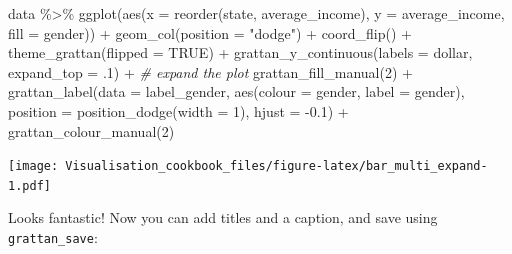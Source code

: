 \documentclass[
]{book}
\newenvironment{Shaded}{\begin{snugshade}}{\end{snugshade}}
\newcommand{\AttributeTok}[1]{\textcolor[rgb]{0.77,0.63,0.00}{#1}}
\newcommand{\CommentTok}[1]{\textcolor[rgb]{0.56,0.35,0.01}{\textit{#1}}}
\newcommand{\ConstantTok}[1]{\textcolor[rgb]{0.00,0.00,0.00}{#1}}
\newcommand{\DecValTok}[1]{\textcolor[rgb]{0.00,0.00,0.81}{#1}}
\newcommand{\FloatTok}[1]{\textcolor[rgb]{0.00,0.00,0.81}{#1}}
\newcommand{\FunctionTok}[1]{\textcolor[rgb]{0.00,0.00,0.00}{#1}}
\newcommand{\NormalTok}[1]{#1}
\newcommand{\SpecialCharTok}[1]{\textcolor[rgb]{0.00,0.00,0.00}{#1}}
\newcommand{\StringTok}[1]{\textcolor[rgb]{0.31,0.60,0.02}{#1}}
\begin{document}
\begin{Shaded}
\begin{Highlighting}[]
\NormalTok{data }\SpecialCharTok{\%\textgreater{}\%} 
  \FunctionTok{ggplot}\NormalTok{(}\FunctionTok{aes}\NormalTok{(}\AttributeTok{x =} \FunctionTok{reorder}\NormalTok{(state, average\_income),}
             \AttributeTok{y =}\NormalTok{ average\_income,}
             \AttributeTok{fill =}\NormalTok{ gender)) }\SpecialCharTok{+} 
  \FunctionTok{geom\_col}\NormalTok{(}\AttributeTok{position =} \StringTok{"dodge"}\NormalTok{) }\SpecialCharTok{+} 
  \FunctionTok{coord\_flip}\NormalTok{() }\SpecialCharTok{+} 
  \FunctionTok{theme\_grattan}\NormalTok{(}\AttributeTok{flipped =} \ConstantTok{TRUE}\NormalTok{) }\SpecialCharTok{+} 
  \FunctionTok{grattan\_y\_continuous}\NormalTok{(}\AttributeTok{labels =}\NormalTok{ dollar, }
                       \AttributeTok{expand\_top =}\NormalTok{ .}\DecValTok{1}\NormalTok{) }\SpecialCharTok{+} \CommentTok{\# expand the plot}
  \FunctionTok{grattan\_fill\_manual}\NormalTok{(}\DecValTok{2}\NormalTok{) }\SpecialCharTok{+} 
  \FunctionTok{grattan\_label}\NormalTok{(}\AttributeTok{data =}\NormalTok{ label\_gender,}
                \FunctionTok{aes}\NormalTok{(}\AttributeTok{colour =}\NormalTok{ gender,}
                    \AttributeTok{label =}\NormalTok{ gender), }
                \AttributeTok{position =} \FunctionTok{position\_dodge}\NormalTok{(}\AttributeTok{width =} \DecValTok{1}\NormalTok{), }
                \AttributeTok{hjust =} \SpecialCharTok{{-}}\FloatTok{0.1}\NormalTok{) }\SpecialCharTok{+} 
  \FunctionTok{grattan\_colour\_manual}\NormalTok{(}\DecValTok{2}\NormalTok{)}
\end{Highlighting}
\end{Shaded}

\texttt{[image: Visualisation\_cookbook\_files/figure-latex/bar\_multi\_expand-1.pdf]}

Looks fantastic! Now you can add titles and a caption, and save using \texttt{grattan\_save}:
\end{document}

